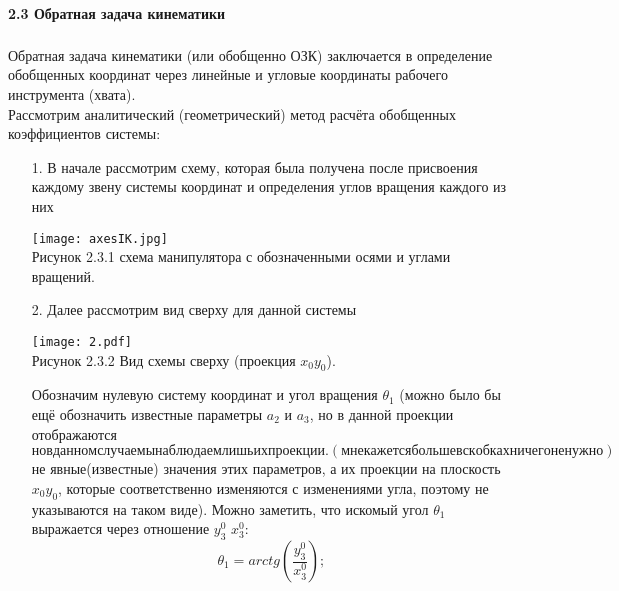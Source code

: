 \paragraph*{2.3 Обратная задача кинематики}$\phantom{-}$\\
\hspace*{\parindent}Обратная задача кинематики (или обобщенно ОЗК) заключается в определение обобщенных координат через линейные и угловые координаты рабочего инструмента (хвата). \\

\hspace*{\parindent}Рассмотрим аналитический (геометрический) метод расчёта обобщенных коэффициентов системы:\\
\begin{enumerate} 
\item[1.]  В начале рассмотрим схему, которая была получена после присвоения каждому звену системы координат и определения углов вращения каждого из них\\

\begin{center}
    \texttt{[image: axesIK.jpg]}\\
    Рисунок 2.3.1 схема манипулятора с обозначенными осями и углами вращений.\\
\end{center}

\item[2.] Далее рассмотрим вид сверху для данной системы\\

\begin{center}
    \texttt{[image: 2.pdf]}\\
     Рисунок 2.3.2 Вид схемы сверху (проекция $x_0 y_0$).\\
\end{center}


Обозначим нулевую систему координат и угол вращения $\theta_1$ (можно было бы ещё обозначить известные параметры $a_2$ и  $a_3$, но в данной проекции отображаются $но в данном случае мы наблюдаем лишь их проекции. (мне кажется больше в скобках ничего не нужно)$не явные(известные) значения этих параметров, а их проекции на плоскость $x_0 y_0$, которые соответственно изменяются с изменениями угла, поэтому не указываются на таком виде). Можно заметить, что искомый угол $\theta_1$ выражается через отношение $y_3^0$ $x_3^0$:\\

\begin{equation}
    \theta_1=arctg(\frac{y_3^0}{x_3^0});
\end{equation}



\end{enumerate}
